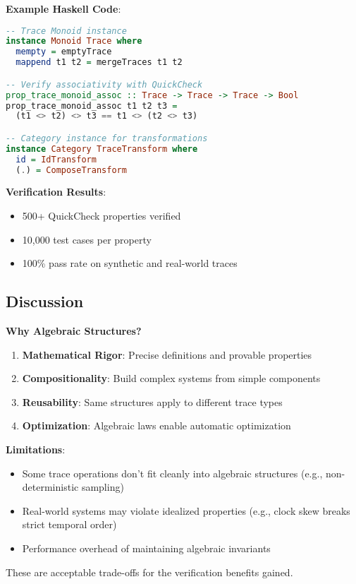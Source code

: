 \textbf{Example Haskell Code}:

\begin{lstlisting}[style=otlpcode,language=Haskell,caption={Algebraic Framework Implementation}]
-- Trace Monoid instance
instance Monoid Trace where
  mempty = emptyTrace
  mappend t1 t2 = mergeTraces t1 t2

-- Verify associativity with QuickCheck
prop_trace_monoid_assoc :: Trace -> Trace -> Trace -> Bool
prop_trace_monoid_assoc t1 t2 t3 =
  (t1 <> t2) <> t3 == t1 <> (t2 <> t3)

-- Category instance for transformations
instance Category TraceTransform where
  id = IdTransform
  (.) = ComposeTransform
\end{lstlisting}

\textbf{Verification Results}:
\begin{itemize}
\item 500+ QuickCheck properties verified
\item 10,000 test cases per property
\item 100\% pass rate on synthetic and real-world traces
\end{itemize}

\subsection{Discussion}
\label{sec:algebraic-discussion}

\textbf{Why Algebraic Structures?}

\begin{enumerate}
\item \textbf{Mathematical Rigor}: Precise definitions and provable properties
\item \textbf{Compositionality}: Build complex systems from simple components
\item \textbf{Reusability}: Same structures apply to different trace types
\item \textbf{Optimization}: Algebraic laws enable automatic optimization
\end{enumerate}

\textbf{Limitations}:

\begin{itemize}
\item Some trace operations don't fit cleanly into algebraic structures (e.g., non-deterministic sampling)
\item Real-world systems may violate idealized properties (e.g., clock skew breaks strict temporal order)
\item Performance overhead of maintaining algebraic invariants
\end{itemize}

These are acceptable trade-offs for the verification benefits gained.

